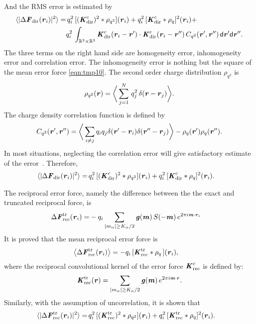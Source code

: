 \documentclass[aps,pre,preprint]{revtex4}
\renewcommand{\v}[1]{\textbf{\textit{#1}}}
\renewcommand{\d}[1]{\textsf{#1}}
\begin{document}
And the RMS error is estimated by
\begin{align}\nonumber
  \langle\vert\Delta\v F_{\textrm{dir}}(\v r_i)\vert^2\rangle
  = &\,
  q_i^2\,[(\v K^c_{\textrm{dir}})^2\ast\rho_{q^2}] (\v r_i) + 
  q_i^2\,[\v K^c_{\textrm{dir}}\ast\rho_{q}]^2 (\v r_i) + \\
  &
  q_i^2\,\int_{\mathbb R^3\times\mathbb R^3}
  \v K^c_{\textrm{dir}}(\v r_i-\v r')\cdot
  \v K^c_{\textrm{dir}}(\v r_i-\v r'')\,
  C_{q^2}(\v r', \v r'')\,
  \d d\v r'\d d\v r''.
\end{align}
The three terms on the right hand side are homogeneity error,
inhomogeneity error and correlation error. The inhomogeneity error is
nothing but the square of the mean error force \eqref{eqn:tmp10}. The
second order charge distribution $\rho_{q^2}$ is
\begin{align}
  \rho_{q^2}(\v r) = 
  \bigg\langle
  \sum_{j = 1}^N
  \,q^2_j\,\delta(\v r - \v r_j)
  \bigg\rangle.
\end{align}
The charge density correlation function is defined by
\begin{align}
  C_{q^2}(\v r', \v r'')
  =
  \bigg\langle
  \sum_{i\neq j}q_iq_j\delta(\v r'-\v r_i)\delta(\v r''-\v r_j)
  \bigg\rangle
  - \rho_q(\v r')\rho_q(\v r'').
\end{align}
In most situations, neglecting the correlation error will give
satisfactory estimate of the error~\cite{wang2012}. Therefore, 
\begin{align}
  \langle\vert\Delta\v F_{\textrm{dir}}(\v r_i)\vert^2\rangle
  = &\,
  q_i^2\,[(\v K^c_{\textrm{dir}})^2\ast\rho_{q^2}] (\v r_i) + 
  q_i^2\,[\v K^c_{\textrm{dir}}\ast\rho_{q}]^2 (\v r_i).
\end{align}


The reciprocal error force, namely the difference between the
the exact and truncated reciprocal force, is
\begin{align}
  \Delta \v F^{\textrm{tr}}_{\textrm{rec}}(\v r_i)
  = & - 
  q_i
  \sum_{\vert m_\alpha\vert \geq K_\alpha/2}
  \v g(\v m) \,
  S(-\v m)\,
  e^{2\pi i\v m\cdot\v r_i} 
\end{align}
It is proved that the mean reciprocal error force is
\begin{align}\label{eqn:tmp18}
  \big\langle
  \Delta \v F^{\textrm{tr}}_{\textrm{rec}}(\v r_i)
  \big\rangle
  &= 
  -q_i\,[\v K^{\textrm{tr}}_{\textrm{rec}}\ast\rho_q\,] (\v r_i),
\end{align}
where the reciprocal convolutional kernel of the error force $\v
K^c_{\textrm{rec}}$ is defined by:
\begin{align}
  \v K^{\textrm{tr}}_{\textrm{rec}}(\v r) =
  \sum_{
      \vert m_\alpha\vert \geq K_\alpha/2}
  \v g(\v m) \,
  e^{2\pi i\v m\cdot\v r}.
\end{align}
Similarly, with the assumption of uncorrelation, it is shown that
\begin{align}
  \langle\vert\Delta\v F^{\textrm{tr}}_{\textrm{rec}}(\v r_i)\vert^2\rangle
  = &\,
  q_i^2\,[(\v K^{\textrm{tr}}_{\textrm{rec}})^2\ast\rho_{q^2}] (\v r_i) + 
  q_i^2\,[\v K^{\textrm{tr}}_{\textrm{rec}}\ast\rho_{q}]^2 (\v r_i).
\end{align}
\end{document}
